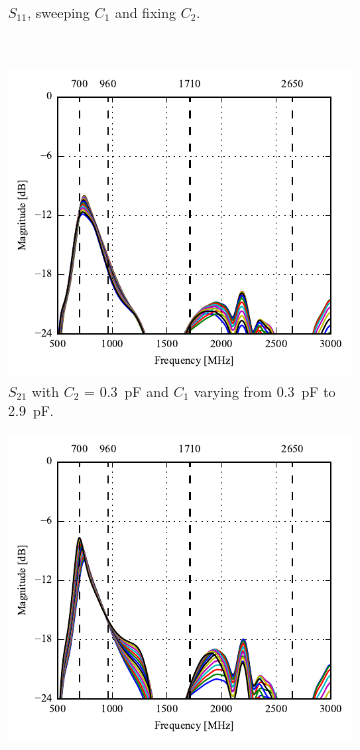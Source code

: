 \begin{figure}[htbp]
\begin{subfigure}[b]{0.49\linewidth}
        \caption{$S_{11}$, sweeping $C_1$ and fixing $C_2$.}
        \label{fig:ant1_s22}
    \end{subfigure}
~
    \begin{subfigure}[b]{0.49\linewidth}
        \centering
        \includegraphics{img/tech_sol/monopole/read_mode/s21_s11}
        \caption{$S_{21}$ with $C_2$ = \SI{0.3}{pF} and $C_1$ varying from \SI{0.3}{pF} to \SI{2.9}{pF}.}
        \label{fig:ant1_s11}
    \end{subfigure}
    \hfill
    \begin{subfigure}[b]{0.49\linewidth}
        \centering
        \includegraphics{img/tech_sol/monopole/read_mode/s21_s22}

\end{subfigure}
\end{figure}
